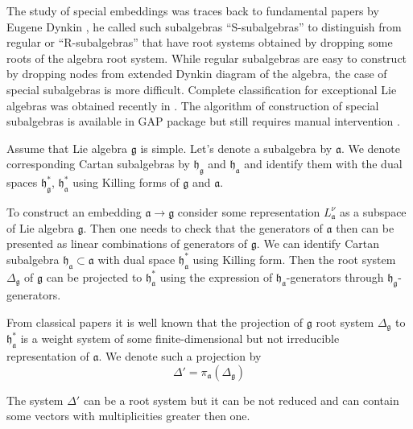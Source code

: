 \documentclass{article}
\newcommand{\pia}{\pi_{\mathfrak{a}}}
\newcommand{\gf}{\mathfrak{g}}
\newcommand{\af}{\mathfrak{a}}
\newcommand{\hf}{\mathfrak{h}}
\newcommand{\hfg}{\hf_{\gf}}
\newcommand{\hfa}{\hf_{\af}}
\begin{document}
The study of special embeddings was traces back to fundamental papers by Eugene Dynkin
\cite{dynkin1952semisimple,dynkin1952maximal}, he called such subalgebras ``S-subalgebras'' to
distinguish from regular or ``R-subalgebras'' that have root systems obtained by dropping some roots
of the algebra root system. While regular subalgebras are easy to construct by dropping nodes from
extended Dynkin diagram of the algebra, the case of special subalgebras is more difficult. Complete
classification for exceptional Lie algebras was obtained recently in \cite{minchenko2006semisimple}.
The algorithm of construction of special subalgebras is available in GAP package but still requires
manual intervention \cite{de2011constructing}.  

Assume that Lie algebra $\gf$ is simple. Let's denote a subalgebra by
$\af$. We denote corresponding Cartan subalgebras by $\hfg$ and $\hfa$ and identify them with the dual
spaces $\hfg^{*}$, $\hfa^{*}$ using Killing forms of $\gf$ and $\af$.

To construct an embedding $\af\to\gf$ consider some representation $L^{\nu}_{\af}$ as a subspace of
Lie algebra $\gf$. Then one needs to check that the generators of $\af$ then can be presented as
linear combinations of generators of $\gf$. We can identify Cartan subalgebra $\hfa\subset \af$ with
dual space $\hfa^{*}$ using Killing form. Then the root system $\Delta_{\gf}$ of $\gf$ can be
projected to $\hfa^{*}$ using the expression of $\hfa$-generators through $\hfg$-generators.


From classical papers \cite{dynkin1952semisimple,dynkin1952maximal} it is well known that the
projection of $\gf$ root system $\Delta_{\gf}$ to $\hfa^{*}$ is a weight system of some
finite-dimensional but not irreducible representation of $\af$.  We denote such a projection by
\begin{equation}
  \label{eq:2}
  \Delta'=\pia\left(\Delta_{\gf}\right)
\end{equation}

The system $\Delta'$ can be a root system but it can be not reduced and can contain some vectors
with multiplicities greater then one. 
\end{document}
